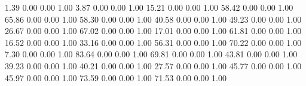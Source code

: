     1.39   0.00   0.00   1.00
    3.87   0.00   0.00   1.00
   15.21   0.00   0.00   1.00
   58.42   0.00   0.00   1.00
   65.86   0.00   0.00   1.00
   58.30   0.00   0.00   1.00
   40.58   0.00   0.00   1.00
   49.23   0.00   0.00   1.00
   26.67   0.00   0.00   1.00
   67.02   0.00   0.00   1.00
   17.01   0.00   0.00   1.00
   61.81   0.00   0.00   1.00
   16.52   0.00   0.00   1.00
   33.16   0.00   0.00   1.00
   56.31   0.00   0.00   1.00
   70.22   0.00   0.00   1.00
    7.30   0.00   0.00   1.00
   83.64   0.00   0.00   1.00
   69.81   0.00   0.00   1.00
   43.81   0.00   0.00   1.00
   39.23   0.00   0.00   1.00
   40.21   0.00   0.00   1.00
   27.57   0.00   0.00   1.00
   45.77   0.00   0.00   1.00
   45.97   0.00   0.00   1.00
   73.59   0.00   0.00   1.00
   71.53   0.00   0.00   1.00
